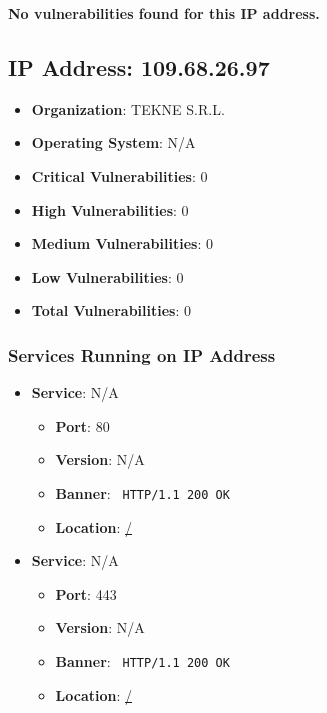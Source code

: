 \documentclass{article}
\begin{document}
\textbf{No vulnerabilities found for this IP address.}




\clearpage



\subsection*{IP Address: 109.68.26.97}

\begin{itemize}
    \item \textbf{Organization}: TEKNE S.R.L.
    \item \textbf{Operating System}:  N/A 
    \item \textbf{Critical Vulnerabilities}: 0
    \item \textbf{High Vulnerabilities}: 0
    \item \textbf{Medium Vulnerabilities}: 0
    \item \textbf{Low Vulnerabilities}: 0
    \item \textbf{Total Vulnerabilities}: 0
\end{itemize}

\subsubsection*{Services Running on IP Address}

\begin{itemize}
    
        \item \textbf{Service}: N/A
        \begin{itemize}
            \item \textbf{Port}: 80
            \item \textbf{Version}:  N/A 
            \item \textbf{Banner}: \texttt{
                HTTP/1.1 200 OK
            }
            \item \textbf{Location}: \href{ / }{ / }
        \end{itemize}
    
        \item \textbf{Service}: N/A
        \begin{itemize}
            \item \textbf{Port}: 443
            \item \textbf{Version}:  N/A 
            \item \textbf{Banner}: \texttt{
                HTTP/1.1 200 OK
            }
            \item \textbf{Location}: \href{ / }{ / }
        \end{itemize}
    
\end{itemize}
\end{document}
